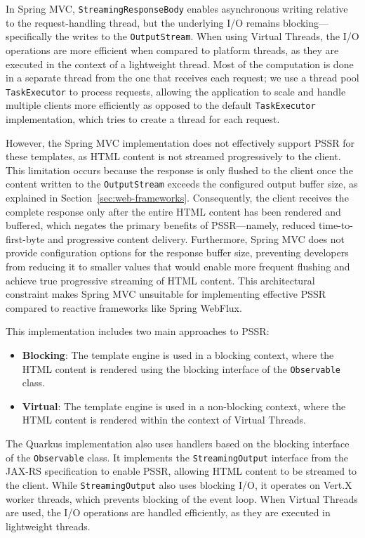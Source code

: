 In Spring MVC, \texttt{StreamingResponseBody} enables asynchronous writing
relative to the request-handling thread, but the underlying I/O remains
blocking—specifically the writes to the \texttt{OutputStream}. When using
Virtual Threads, the I/O operations are more efficient when compared to
platform threads, as they are executed in the context of a lightweight thread.
Most of the computation is done in a separate thread from the one that receives
each request; we use a thread pool \texttt{TaskExecutor} to process requests,
allowing the application to scale and handle multiple clients more efficiently
as opposed to the default \texttt{TaskExecutor} implementation, which tries to
create a thread for each request.

However, the Spring MVC implementation does not effectively support PSSR for
these templates, as HTML content is not streamed progressively to the client.
This limitation occurs because the response is only flushed to the client once
the content written to the \texttt{OutputStream} exceeds the configured output
buffer size, as explained in Section~\ref{sec:web-frameworks}. Consequently,
the client receives the complete response only after the entire HTML content
has been rendered and buffered, which negates the primary benefits of
PSSR—namely, reduced time-to-first-byte and progressive content delivery.
Furthermore, Spring MVC does not provide configuration options for the response
buffer size, preventing developers from reducing it to smaller values that
would enable more frequent flushing and achieve true progressive streaming of
HTML content. This architectural constraint makes Spring MVC unsuitable for
implementing effective PSSR compared to reactive frameworks like Spring
WebFlux.

This implementation includes two main approaches to PSSR\@:
\begin{itemize}
      \item \textbf{Blocking}: The template engine is used in a blocking context,
            where the HTML content is rendered using the blocking interface of the
            \texttt{Observable} class.
      \item \textbf{Virtual}: The template engine is used in a non-blocking context,
            where the HTML content is rendered within the context of Virtual Threads.
\end{itemize}

The Quarkus implementation also uses handlers based on the blocking interface
of the \texttt{Observable} class. It implements the \texttt{StreamingOutput}
interface from the JAX-RS specification to enable PSSR, allowing HTML content
to be streamed to the client. While \texttt{StreamingOutput} also uses blocking
I/O, it operates on Vert.X worker threads, which prevents blocking of the event
loop. When Virtual Threads are used, the I/O operations are handled
efficiently, as they are executed in lightweight threads.

